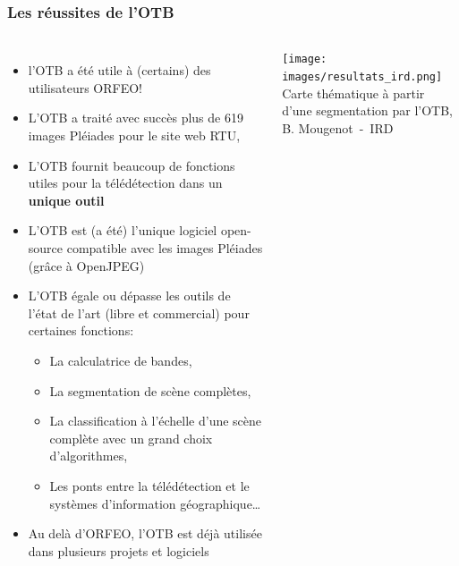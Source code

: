 \documentclass[8pt]{beamer}
\begin{document}
\begin{frame}
\frametitle{Les réussites de l'OTB}
\vspace{-0.5cm}
\begin{columns}
\begin{itemize}
\item l'OTB a été utile à (certains) des utilisateurs ORFEO!
\item L'OTB a traité avec succès plus de 619 images Pléiades pour le site web RTU,
\item L'OTB fournit beaucoup de fonctions utiles pour la télédétection dans un \textbf{unique outil}
\item L'OTB est (a été) l'unique logiciel open-source compatible avec les images Pléiades (grâce à OpenJPEG)
\item L'OTB égale ou dépasse les outils de l'état de l'art (libre et commercial) pour certaines fonctions:
\begin{itemize}
\item La calculatrice de bandes,
\item La segmentation de scène complètes,
\item La classification à l'échelle d'une scène complète avec un grand choix d'algorithmes,
\item Les ponts entre la télédétection et le systèmes d'information géographique\ldots
\end{itemize}
\item Au delà d'ORFEO, l'OTB est déjà utilisée dans plusieurs projets et logiciels
\end{itemize}
\texttt{[image: images/resultats\_ird.png]}\\
\tiny{Carte thématique à partir d'une segmentation par l'OTB, B. Mougenot~-~IRD}
\end{columns}
\end{frame}
\end{document}
